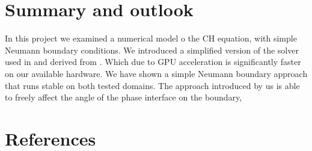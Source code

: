 \documentclass{mimosis}
\begin{document}
\chapter{Summary and outlook}
\label{sec:org22015fe}
In this project we examined a numerical model o the CH equation, with simple Neumann boundary conditions. We introduced a simplified version of the solver used in \autocite{Ulmer_CHRelaxed_2024} and derived from \autocite{SHIN20117441}. Which due to GPU acceleration is significantly faster on our available hardware. We have shown a simple Neumann boundary approach that runs stable on both tested domains. The approach introduced by us is able to freely affect the angle of the phase interface on the boundary,
\chapter{References}
\label{sec:orgd5d272f}
\printbibliography
\end{document}
